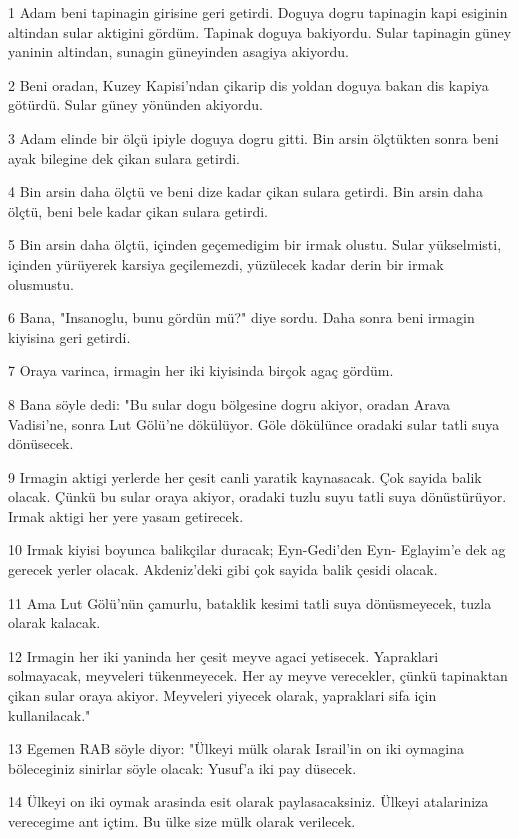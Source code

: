 \par 1 Adam beni tapinagin girisine geri getirdi. Doguya dogru tapinagin kapi esiginin altindan sular aktigini gördüm. Tapinak doguya bakiyordu. Sular tapinagin güney yaninin altindan, sunagin güneyinden asagiya akiyordu.
\par 2 Beni oradan, Kuzey Kapisi'ndan çikarip dis yoldan doguya bakan dis kapiya götürdü. Sular güney yönünden akiyordu.
\par 3 Adam elinde bir ölçü ipiyle doguya dogru gitti. Bin arsin ölçtükten sonra beni ayak bilegine dek çikan sulara getirdi.
\par 4 Bin arsin daha ölçtü ve beni dize kadar çikan sulara getirdi. Bin arsin daha ölçtü, beni bele kadar çikan sulara getirdi.
\par 5 Bin arsin daha ölçtü, içinden geçemedigim bir irmak olustu. Sular yükselmisti, içinden yürüyerek karsiya geçilemezdi, yüzülecek kadar derin bir irmak olusmustu.
\par 6 Bana, "Insanoglu, bunu gördün mü?" diye sordu. Daha sonra beni irmagin kiyisina geri getirdi.
\par 7 Oraya varinca, irmagin her iki kiyisinda birçok agaç gördüm.
\par 8 Bana söyle dedi: "Bu sular dogu bölgesine dogru akiyor, oradan Arava Vadisi'ne, sonra Lut Gölü'ne dökülüyor. Göle dökülünce oradaki sular tatli suya dönüsecek.
\par 9 Irmagin aktigi yerlerde her çesit canli yaratik kaynasacak. Çok sayida balik olacak. Çünkü bu sular oraya akiyor, oradaki tuzlu suyu tatli suya dönüstürüyor. Irmak aktigi her yere yasam getirecek.
\par 10 Irmak kiyisi boyunca balikçilar duracak; Eyn-Gedi'den Eyn- Eglayim'e dek ag gerecek yerler olacak. Akdeniz'deki gibi çok sayida balik çesidi olacak.
\par 11 Ama Lut Gölü'nün çamurlu, bataklik kesimi tatli suya dönüsmeyecek, tuzla olarak kalacak.
\par 12 Irmagin her iki yaninda her çesit meyve agaci yetisecek. Yapraklari solmayacak, meyveleri tükenmeyecek. Her ay meyve verecekler, çünkü tapinaktan çikan sular oraya akiyor. Meyveleri yiyecek olarak, yapraklari sifa için kullanilacak."
\par 13 Egemen RAB söyle diyor: "Ülkeyi mülk olarak Israil'in on iki oymagina böleceginiz sinirlar söyle olacak: Yusuf'a iki pay düsecek.
\par 14 Ülkeyi on iki oymak arasinda esit olarak paylasacaksiniz. Ülkeyi atalariniza verecegime ant içtim. Bu ülke size mülk olarak verilecek.
